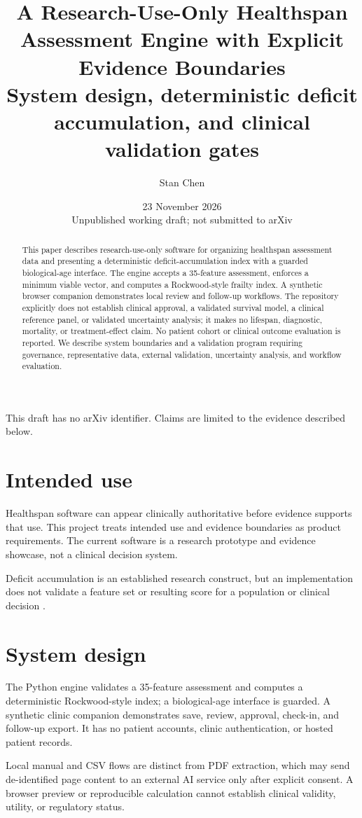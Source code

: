 \documentclass[11pt]{article}
\title{A Research-Use-Only Healthspan Assessment Engine with Explicit Evidence Boundaries\\\large System design, deterministic deficit accumulation, and clinical validation gates}
\author{Stan Chen}
\date{23 November 2026\\[4pt]\small Unpublished working draft; not submitted to arXiv}
\begin{document}
\maketitle
\begin{center}\small This draft has no arXiv identifier. Claims are limited to the evidence described below.\end{center}
\begin{abstract}
This paper describes research-use-only software for organizing healthspan assessment data and presenting a deterministic deficit-accumulation index with a guarded biological-age interface. The engine accepts a 35-feature assessment, enforces a minimum viable vector, and computes a Rockwood-style frailty index. A synthetic browser companion demonstrates local review and follow-up workflows. The repository explicitly does not establish clinical approval, a validated survival model, a clinical reference panel, or validated uncertainty analysis; it makes no lifespan, diagnostic, mortality, or treatment-effect claim. No patient cohort or clinical outcome evaluation is reported. We describe system boundaries and a validation program requiring governance, representative data, external validation, uncertainty analysis, and workflow evaluation.
\end{abstract}
\section{Intended use}
Healthspan software can appear clinically authoritative before evidence supports that use. This project treats intended use and evidence boundaries as product requirements. The current software is a research prototype and evidence showcase, not a clinical decision system.\par
Deficit accumulation is an established research construct, but an implementation does not validate a feature set or resulting score for a population or clinical decision \cite{r1}.\par
\section{System design}
The Python engine validates a 35-feature assessment and computes a deterministic Rockwood-style index; a biological-age interface is guarded. A synthetic clinic companion demonstrates save, review, approval, check-in, and follow-up export. It has no patient accounts, clinic authentication, or hosted patient records.\par
Local manual and CSV flows are distinct from PDF extraction, which may send de-identified page content to an external AI service only after explicit consent. A browser preview or reproducible calculation cannot establish clinical validity, utility, or regulatory status.\par
\end{document}
